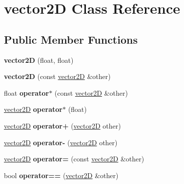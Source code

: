 \hypertarget{classvector2_d}{}\section{vector2D Class Reference}
\label{classvector2_d}
\subsection*{Public Member Functions}
\begin{DoxyCompactItemize}
\item 
\mbox{\label{classvector2_d_a09a3efc9fc4df107e3850bf8f8cd2c38}} 
{\bfseries vector2D} (float, float)
\item 
\mbox{\label{classvector2_d_a3934293bb4197e6bb3d46671e5cbebe5}} 
{\bfseries vector2D} (const \hyperlink{classvector2_d}{vector2D} \&other)
\item 
\mbox{\label{classvector2_d_ab23645af1082fa224fb126616fe46ef4}} 
float {\bfseries operator$\ast$} (const \hyperlink{classvector2_d}{vector2D} \&other)
\item 
\mbox{\label{classvector2_d_a3b9d934d736f06ab6c2d6289311e7d42}} 
\hyperlink{classvector2_d}{vector2D} {\bfseries operator$\ast$} (float)
\item 
\mbox{\label{classvector2_d_ac11309bc64663c742e0d24d3048332c0}} 
\hyperlink{classvector2_d}{vector2D} {\bfseries operator+} (\hyperlink{classvector2_d}{vector2D} other)
\item 
\mbox{\label{classvector2_d_a052e4ea4fc6871415a743a7da0e0619a}} 
\hyperlink{classvector2_d}{vector2D} {\bfseries operator-\/} (\hyperlink{classvector2_d}{vector2D} other)
\item 
\mbox{\label{classvector2_d_af5ef56d3a9d499a5926e53b0dc8a126a}} 
\hyperlink{classvector2_d}{vector2D} {\bfseries operator=} (const \hyperlink{classvector2_d}{vector2D} \&other)
\item 
\mbox{\label{classvector2_d_a7e55d4ace3a178d979df35fa7cdde304}} 
bool {\bfseries operator==} (\hyperlink{classvector2_d}{vector2D} \&other)
\item 

\end{DoxyCompactItemize}
